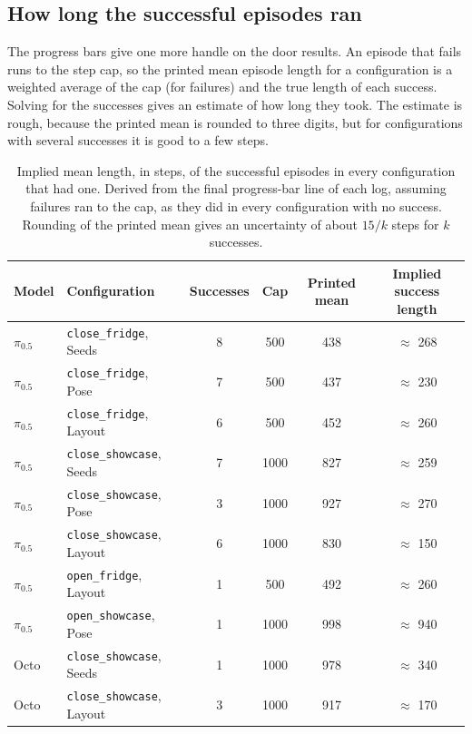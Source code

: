 \subsection*{How long the successful episodes ran}

The progress bars give one more handle on the door results. An episode that fails runs to the step cap, so the printed mean episode length for a configuration is a weighted average of the cap (for failures) and the true length of each success. Solving for the successes gives an estimate of how long they took. The estimate is rough, because the printed mean is rounded to three digits, but for configurations with several successes it is good to a few steps.

{\renewcommand{\arraystretch}{1.12}
\begin{table}[H]
\centering
\footnotesize
\setlength{\tabcolsep}{5pt}
\begin{tabular}{llcccc}
\toprule
Model & Configuration & Successes & Cap & Printed mean & Implied success length \\
\midrule
$\pi_{0.5}$ & \texttt{close\_fridge}, Seeds   & 8 & 500  & 438 & $\approx$ 268 \\
$\pi_{0.5}$ & \texttt{close\_fridge}, Pose    & 7 & 500  & 437 & $\approx$ 230 \\
$\pi_{0.5}$ & \texttt{close\_fridge}, Layout  & 6 & 500  & 452 & $\approx$ 260 \\
$\pi_{0.5}$ & \texttt{close\_showcase}, Seeds & 7 & 1000 & 827 & $\approx$ 259 \\
$\pi_{0.5}$ & \texttt{close\_showcase}, Pose  & 3 & 1000 & 927 & $\approx$ 270 \\
$\pi_{0.5}$ & \texttt{close\_showcase}, Layout & 6 & 1000 & 830 & $\approx$ 150 \\
$\pi_{0.5}$ & \texttt{open\_fridge}, Layout   & 1 & 500  & 492 & $\approx$ 260 \\
$\pi_{0.5}$ & \texttt{open\_showcase}, Pose   & 1 & 1000 & 998 & $\approx$ 940 \\
Octo        & \texttt{close\_showcase}, Seeds & 1 & 1000 & 978 & $\approx$ 340 \\
Octo        & \texttt{close\_showcase}, Layout & 3 & 1000 & 917 & $\approx$ 170 \\
\bottomrule
\end{tabular}
\caption{Implied mean length, in steps, of the successful episodes in every configuration that had one. Derived from the final progress-bar line of each log, assuming failures ran to the cap, as they did in every configuration with no success. Rounding of the printed mean gives an uncertainty of about $15/k$ steps for $k$ successes.}
\label{tab:success-length}
\end{table}}

